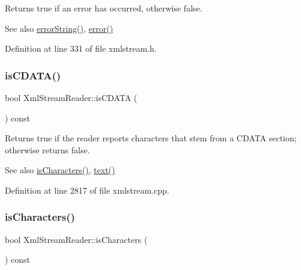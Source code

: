 Returns {\ttfamily true} if an error has occurred, otherwise {\ttfamily false}.

\begin{DoxySeeAlso}{See also}
\hyperlink{class_xml_stream_reader_a119d913daa2a7b8174f0b26dcd7e9720}{error\+String()}, \hyperlink{class_xml_stream_reader_ae9a7e8fe9f15b0f5c4ec5fa080c6249f}{error()} 
\end{DoxySeeAlso}


Definition at line 331 of file xmlstream.\+h.

\mbox{\label{class_xml_stream_reader_ad1c5f23d9c60ab41c032940191d71ae4}} 
\subsubsection{\texorpdfstring{is\+C\+D\+A\+T\+A()}{isCDATA()}}
{\footnotesize\ttfamily bool Xml\+Stream\+Reader\+::is\+C\+D\+A\+TA (\begin{DoxyParamCaption}{ }\end{DoxyParamCaption}) const}

Returns {\ttfamily true} if the reader reports characters that stem from a C\+D\+A\+TA section; otherwise returns {\ttfamily false}.

\begin{DoxySeeAlso}{See also}
\hyperlink{class_xml_stream_reader_a6d14d53c064bab08ac876ffaf2448742}{is\+Characters()}, \hyperlink{class_xml_stream_reader_a1d129d0171b231efac34d7ee4480a50f}{text()} 
\end{DoxySeeAlso}


Definition at line 2817 of file xmlstream.\+cpp.

\mbox{\label{class_xml_stream_reader_a6d14d53c064bab08ac876ffaf2448742}} 
\subsubsection{\texorpdfstring{is\+Characters()}{isCharacters()}}
{\footnotesize\ttfamily bool Xml\+Stream\+Reader\+::is\+Characters (\begin{DoxyParamCaption}{ }\end{DoxyParamCaption}) const\hspace{0.3cm}{\ttfamily [inline]}}

